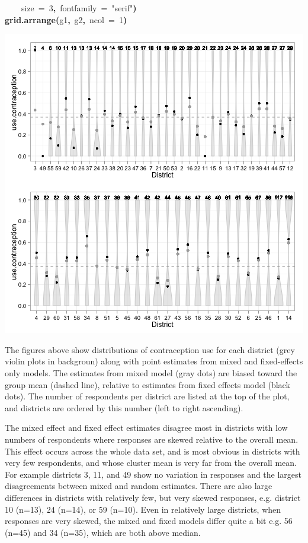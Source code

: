 \documentclass{article}
\makeatletter
\newcommand{\hlnumber}[1]{\textcolor[rgb]{0,0,0}{#1}}%
\newcommand{\hlfunctioncall}[1]{\textcolor[rgb]{.5,0,.33}{\textbf{#1}}}%
\newcommand{\hlstring}[1]{\textcolor[rgb]{.6,.6,1}{#1}}%
\newcommand{\hlkeyword}[1]{\textbf{#1}}%
\newcommand{\hlargument}[1]{\textcolor[rgb]{.69,.25,.02}{#1}}%
\newcommand{\hlsymbol}[1]{#1}%
\newcommand{\hlstd}[1]{\textcolor[rgb]{0,0,0}{#1}}%
\newenvironment{kframe}{%
 \def\FrameCommand##1{\hskip\@totalleftmargin \hskip-\fboxsep
 \colorbox{shadecolor}{##1}\hskip-\fboxsep
     \hskip-\linewidth \hskip-\@totalleftmargin \hskip\columnwidth}%
 \MakeFramed {\advance\hsize-\width
   \@totalleftmargin\z@ \linewidth\hsize
   \@setminipage}}%
 {\par\unskip\endMakeFramed}
\newenvironment{knitrout}{}{} %
\makeatother
\begin{document}
\begin{knitrout}
{\begin{kframe}
\begin{flushleft}
\hlstd{}{\ }{\ }{\ }{\ }\hlargument{size}{\ }\hlargument{=}{\ }\hlnumber{3}\hlkeyword{,}{\ }\hlargument{fontfamily}{\ }\hlargument{=}{\ }\hlstring{"serif"}\hlkeyword{)}\hspace*{\fill}\\
\hlstd{}\hlfunctioncall{grid.arrange}\hlkeyword{(}\hlsymbol{g1}\hlkeyword{,}{\ }\hlsymbol{g2}\hlkeyword{,}{\ }\hlargument{ncol}{\ }\hlargument{=}{\ }\hlnumber{1}\hlkeyword{)}\mbox{}
\normalfont
\end{flushleft}
\includegraphics{compare-plot} \end{kframe}}
\end{knitrout}


The figures above show distributions of contraception use for each district (grey violin plots in backgroun) along with point estimates from mixed and fixed-effects only models. The estimates from mixed model (gray dots) are biased toward the group mean (dashed line), relative to estimates from fixed effects model (black dots).
The number of respondents per district are listed at the top of the plot, and districts are ordered by this number (left to right ascending).

The mixed effect and fixed effect estimates disagree most in districts with low numbers of respondents where responses are skewed relative to the overall mean. 
This effect occurs across the whole data set, and is most obvious in districts with very few respondents, and whose cluster mean is very far from the overall mean. 
For example districts 3, 11, and 49 show no variation in responses and the largest disagreements between mixed and random estimates. 
There are also large differences in districts with relatively few, but very skewed responses, e.g. district 10 (n=13), 24 (n=14), or 59 (n=10).
Even in relatively large districts, when responses are very skewed, the mixed and fixed models differ quite a bit e.g. 56 (n=45) and 34 (n=35), which are both above median.
\end{document}
